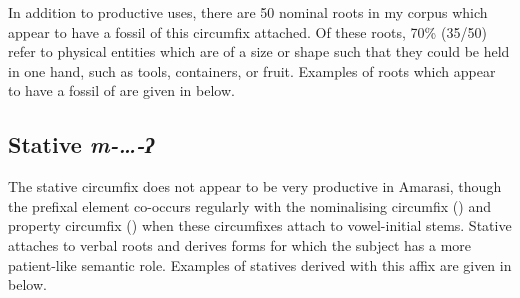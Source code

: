 In addition to productive uses, there are 50 nominal roots
in my corpus which appear to have a fossil of this circumfix attached.
Of these roots, 70{\%} (35/50) refer to physical entities which are of a size or shape 
such that they could be held in one hand, such as tools, containers, or fruit.
Examples of roots which appear to have a fossil of  are given in  below.

\begin{exe}
	\label{ex:RooFosNomCir}
\end{exe}

\subsection{Stative \it{m-{\ldots}-ʔ}}\label{sec:StaPre}
The stative circumfix  does not appear to be very productive in Amarasi,
though the prefixal element  co-occurs regularly with the nominalising circumfix
 () and property circumfix  ()
when these circumfixes attach to vowel-initial stems.
Stative  attaches to verbal roots and derives forms for which
the subject has a more patient-like semantic role.
Examples of statives derived with this affix are given in  below.

\begin{exe}
	\label{ex:StaVerM-}
\end{exe}

